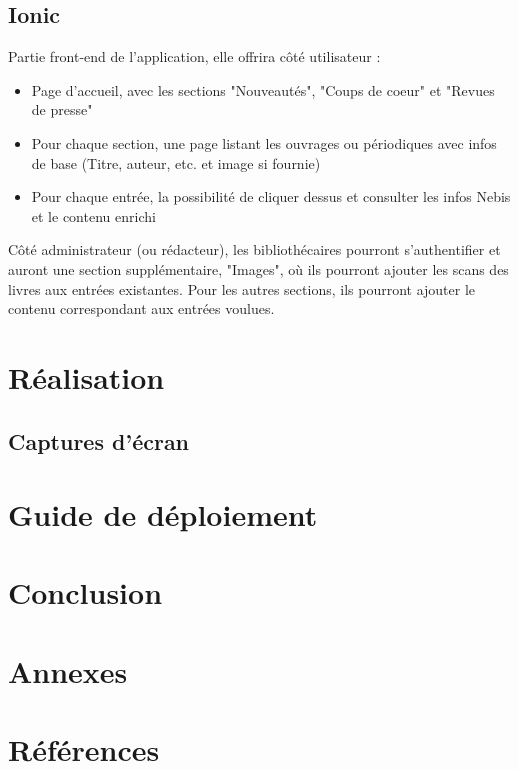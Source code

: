 \documentclass[a4paper, 12pt]{article}
\begin{document}
\subsection{Ionic}
Partie front-end de l'application, elle offrira côté utilisateur :
\begin{itemize}
    \item Page d'accueil, avec les sections "Nouveautés", "Coups de coeur" et "Revues de presse"
    \item Pour chaque section, une page listant les ouvrages ou périodiques avec infos de base
        (Titre, auteur, etc. et image si fournie)
    \item Pour chaque entrée, la possibilité de cliquer dessus et consulter les infos Nebis et le contenu enrichi
\end{itemize}
Côté administrateur (ou rédacteur), les bibliothécaires pourront s'authentifier et auront une section supplémentaire,
"Images", où ils pourront ajouter les scans des livres aux entrées existantes. Pour les autres sections, ils
pourront ajouter le contenu correspondant aux entrées voulues.


\section{Réalisation}
\subsection{Captures d'écran}
\section{Guide de déploiement}
\section{Conclusion}

\section{Annexes}

\section{Références}


\end{document}
